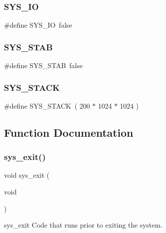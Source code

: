 \mbox{\label{sys_8h_a5f4e1d26549f4beb254b0b63f30e5916}} 
\subsubsection{S\+Y\+S\+\_\+\+IO}
{\footnotesize\ttfamily \#define S\+Y\+S\+\_\+\+IO~false}

\mbox{\label{sys_8h_aeca3e77ce959284ab23d38a1a9b524aa}} 
\subsubsection{S\+Y\+S\+\_\+\+S\+T\+AB}
{\footnotesize\ttfamily \#define S\+Y\+S\+\_\+\+S\+T\+AB~false}

\mbox{\label{sys_8h_aacd2adb511d99465bcfd72082b8492a5}} 
\subsubsection{S\+Y\+S\+\_\+\+S\+T\+A\+CK}
{\footnotesize\ttfamily \#define S\+Y\+S\+\_\+\+S\+T\+A\+CK~( 200 $\ast$ 1024 $\ast$ 1024 )}



\subsection{Function Documentation}
\mbox{\label{sys_8h_ac8c2364fd51221e5ac983f174aeb289f}} 
\subsubsection{sys\+\_\+exit()}
{\footnotesize\ttfamily void sys\+\_\+exit (\begin{DoxyParamCaption}\item[{void}]{ }\end{DoxyParamCaption})}

sys\+\_\+exit Code that runs prior to exiting the system. \mbox{\label{sys_8h_af411a8bc6b7ed4b0af9114e10c959448}} 

